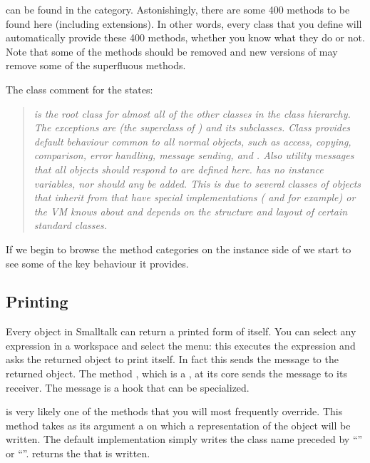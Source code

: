 \documentclass[a4paper,10pt,twoside]{book}
\begin{document}
 can be found in the  category. Astonishingly, there are some 400 methods to be found here (including extensions).  In other words, every class that you define will automatically provide these 400 methods, whether you know what they do or not. Note that some of the methods should be removed and new versions of \pharo may remove some of the superfluous methods. 

The class comment for the  states:

\begin{quote}
\textit{ is the root class for almost all of the other classes in the class hierarchy. The exceptions are  (the superclass of ) and its subclasses.
Class  provides default behaviour common to all normal objects, such as access, copying, comparison, error handling, message sending, and . Also utility messages that all objects should respond to are defined here.
 has no instance variables, nor should any be added. This is due to several classes of objects that inherit from  that have special implementations ( and  for example) or the VM knows about and depends on the structure and layout of certain standard classes.}
\end{quote}

If we begin to browse the method categories on the instance side of  we start to see some of the key behaviour it provides.

\subsection{Printing}
Every object in Smalltalk can return a printed form of itself. You can select any expression in a workspace and select the  menu: this executes the expression and asks the returned object to print itself. In fact this sends the message  to the returned object. The method , which is a , at its core sends the message  to its receiver. The message  is a hook that can be specialized. 

 is very likely one of the methods that you will most frequently override. This method takes as its argument a  on which a  representation of the object will be written. The default implementation simply writes the class name preceded by ``'' or ``''.  returns the  that is written.
\end{document}
